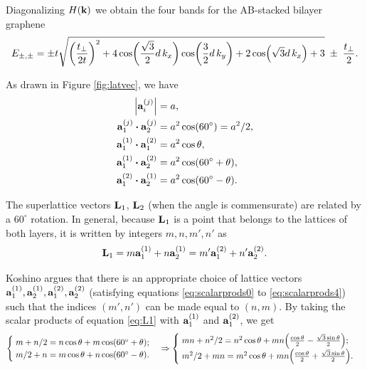 Diagonalizing $H({\vb{k}})$ we obtain the four bands for the AB-stacked bilayer graphene
\begin{equation} \label{eq:ab-four_bands}
E_{\pm,\pm} = \pm t
\sqrt{
\qty(\frac{t_\perp}{2t})^2 +
4 \cos(\frac{\sqrt{3}}{2} d \, k_x) \cos(\frac{3}{2} d \, k_y) + 2 \cos(\sqrt{3} d \, k_x) + 3
}
\; \pm \; \frac{t_\perp}{2}.
\end{equation}






As drawn in Figure \ref{fig:latvec}, we have
\begin{align}
\label{eq:scalarprods0}
\abs{\a_i^{(j)}} &= a, \\
\label{eq:scalarprods1}
\vb{a}_1^{(j)} \vdot \vb{a}_2^{(j)} &= a^2 \cos(60^\circ) = a^2/2, \\
\label{eq:scalarprods2}
\vb{a}_1^{(1)} \vdot \vb{a}_1^{(2)} &= a^2 \cos\theta, \\
\label{eq:scalarprods3}
\vb{a}_1^{(1)} \vdot \vb{a}_2^{(2)} &= a^2 \cos(60^\circ + \theta), \\
\label{eq:scalarprods4}
\vb{a}_1^{(2)} \vdot \vb{a}_2^{(1)} &= a^2 \cos(60^\circ - \theta).
\end{align}

The superlattice vectors $\vb{L}_1$, $\vb{L}_2$ (when the angle is commensurate) are related by a $60^\circ$ rotation. In general, because $\vb{L}_1$ is a point that belongs to the lattices of both layers, it is written by integers $m,n,m',n'$ as
\begin{equation} \label{eq:L1}
\vb{L}_1 = m\vb{a}_1^{(1)} + n\vb{a}_2^{(1)} = m'\vb{a}_1^{(2)} + n'\vb{a}_2^{(2)}.
\end{equation}

Koshino \cite{koshino2012} argues that there is an appropriate choice of lattice vectors $\vb{a}_1^{(1)}, \vb{a}_2^{(1)}, \vb{a}_1^{(2)}, \vb{a}_2^{(2)}$ (satisfying equations \ref{eq:scalarprods0} to \ref{eq:scalarprods4}) such that the indices $(m',n')$ can be made equal to $(n,m)$. By taking the scalar products of equation \ref{eq:L1} with $\vb{a}_1^{(1)}$ and $\vb{a}_1^{(2)}$, we get
$$
\begin{cases}
\; m + n/2 = n \cos\theta + m \cos(60^\circ + \theta); \\
\; m/2 + n = m \cos\theta + n \cos(60^\circ - \theta).
\end{cases}
\Rightarrow
\begin{cases}
\; mn + n^2/2 = n^2 \cos\theta + mn \qty(\frac{\cos\theta}{2}
- \frac{\sqrt{3} \sin\theta}{2}); \\
\; m^2/2 + mn = m^2 \cos\theta + mn \qty(\frac{\cos\theta}{2}
+ \frac{\sqrt{3} \sin\theta}{2}).
\end{cases}
$$


